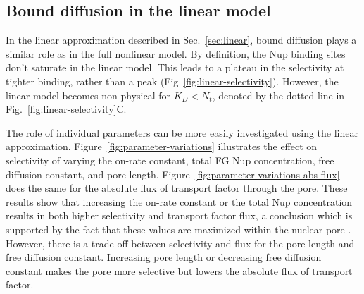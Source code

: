 

\subsection{Bound diffusion in the linear model}

In the linear approximation described in Sec.~\ref{sec:linear}, bound diffusion plays a similar role as in the full nonlinear model.  By definition, the Nup binding sites don't saturate in the linear model.  This leads to a plateau in the selectivity at tighter binding, rather than a peak (Fig~\ref{fig:linear-selectivity}).  However, the linear model becomes non-physical for $K_D < N_t$, denoted by the dotted line in Fig.~\ref{fig:linear-selectivity}C.

The role of individual parameters can be more easily investigated using the linear approximation.  Figure~\ref{fig:parameter-variations} illustrates the effect on selectivity of varying the on-rate constant, total FG Nup concentration, free diffusion constant, and pore length.  Figure~\ref{fig:parameter-variations-abs-flux} does the same for the absolute flux of transport factor through the pore.  These results show that increasing the on-rate constant or the total Nup concentration results in both higher selectivity and transport factor flux, a conclusion which is supported by the fact that these values are maximized within the nuclear pore \cite{milles15, hough15}.  However, there is a trade-off between selectivity and flux for the pore length and free diffusion constant.  Increasing pore length or decreasing free diffusion constant makes the pore more selective but lowers the absolute flux of transport factor.

